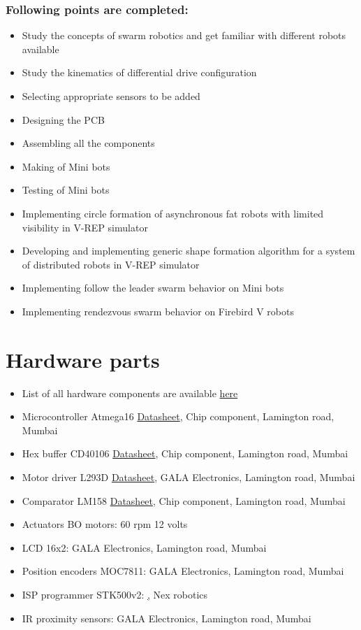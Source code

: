 \documentclass[a4paper,12pt,oneside]{book}
\begin{document}
\subsection*{Following points are completed:}
\begin{itemize}
\item Study the concepts of swarm robotics and get familiar
with different robots available 
\item Study the kinematics of differential drive configuration 
\item Selecting appropriate sensors to be added 
\item Designing the PCB 
\item Assembling all the components 
\item Making of Mini bots 
\item Testing of Mini bots
\item Implementing circle formation of asynchronous fat robots with limited visibility in V-REP simulator
\item Developing and implementing generic shape formation algorithm for a system of distributed robots in V-REP simulator
\item Implementing follow the leader swarm behavior on Mini bots
\item Implementing rendezvous swarm behavior on Firebird V robots
\end{itemize}

\chapter[Hardware parts]{Hardware parts}
\begin{itemize}
  \item List of all hardware components are available \href{./COMPONENT LIST/Small_robot_PCB_schematic_WITH_COST.pdf}{here} 
  \item Microcontroller Atmega16 \href{./datasheet/atmega16.pdf}{Datasheet}, {Chip component, Lamington road, Mumbai} 
  \item Hex buffer CD40106 \href{./datasheet/CD40106.pdf}{Datasheet}, {Chip component, Lamington road, Mumbai} 
  \item Motor driver L293D \href{./datasheet/L293.pdf}{Datasheet}, {GALA Electronics, Lamington road, Mumbai} 
  \item Comparator LM158 \href{./datasheet/lm158-n.pdf}{Datasheet}, {Chip component, Lamington road, Mumbai}
  \item Actuators BO motors: 60 rpm 12 volts	
  \item LCD 16x2: GALA Electronics, Lamington road, Mumbai
  \item Position encoders MOC7811: GALA Electronics, Lamington road, Mumbai
  \item ISP programmer STK500v2: \href{}, {Nex robotics}
  \item IR proximity sensors: GALA Electronics, Lamington road, Mumbai
\end{itemize}
\end{document}
